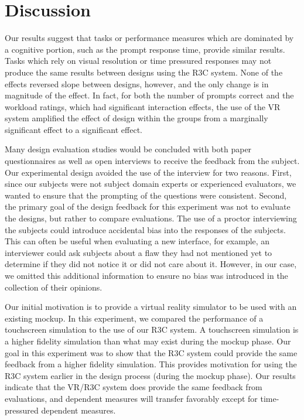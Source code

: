 \section{Discussion}
\label{sec:de_discussion}


Our results suggest that tasks or performance measures which are dominated by a cognitive portion, such as the prompt response time, provide similar results.
Tasks which rely on visual resolution or time pressured responses may not produce the same results between designs using the R3C system.
None of the effects reversed slope between designs, however, and the only change is in magnitude of the effect.
In fact, for both the number of prompts correct and the workload ratings, which had significant interaction effects, the use of the VR system amplified the effect of design within the groups from a marginally significant effect to a significant effect.

Many design evaluation studies would be concluded with both paper questionnaires as well as open interviews to receive the feedback from the subject.
Our experimental design avoided the use of the interview for two reasons.
First, since our subjects were not subject domain experts or experienced evaluators, we wanted to ensure that the prompting of the questions were consistent.
Second, the primary goal of the design feedback for this experiment was not to evaluate the designs, but rather to compare evaluations.
The use of a proctor interviewing the subjects could introduce accidental bias into the responses of the subjects.
This can often be useful when evaluating a new interface, for example, an interviewer could ask subjects about a flaw they had not mentioned yet to determine if they did not notice it or did not care about it.
However, in our case, we omitted this additional information to ensure no bias was introduced in the collection of their opinions.

Our initial motivation is to provide a virtual reality simulator to be used with an existing mockup.
In this experiment, we compared the performance of a touchscreen simulation to the use of our R3C system.
A touchscreen simulation is a higher fidelity simulation than what may exist during the mockup phase.
Our goal in this experiment was to show that the R3C system could provide the same feedback from a higher fidelity simulation.
This provides motivation for using the R3C system earlier in the design process (during the mockup phase).
Our results indicate that the VR/R3C system does provide the same feedback from evaluations, and dependent measures will transfer favorably except for time-pressured dependent measures.

